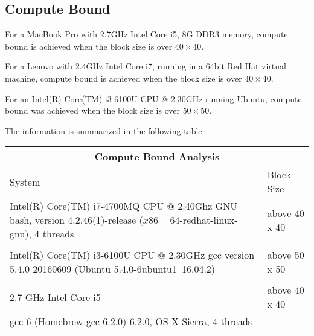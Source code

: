 \documentclass[12pt]{article}
\newcommand{\0}{\mathbf{0}}
\begin{document}
\subsection{Compute Bound}

For a MacBook Pro with 2.7GHz Intel Core i5, 8G DDR3 memory, compute bound is achieved when the block size is over $40\times 40$.

\bigskip

For a Lenovo with 2.4GHz Intel Core i7, running in a 64bit Red Hat virtual machine, compute bound is achieved when the block size is over $40\times 40$.

\bigskip

For an Intel(R) Core(TM) i3-6100U CPU @ 2.30GHz running Ubuntu, compute bound was achieved when the block size is over $50\times 50$. 


\newpage

The information is summarized in the following table:

\begin{center}

    \begin{tabular}{ |p{9cm}||p{3cm}|}
	\hline
	\multicolumn{2}{|c|}{Compute Bound Analysis} \\
	\hline
	System& Block Size \\
	\hline
	Intel(R) Core(TM) i7-4700MQ CPU @ 2.40Ghz
	GNU bash, version 4.2.46(1)-release ($x86-64$-redhat-linux-gnu), 4 threads & above 40 x 40\\
	&  \\
	Intel(R) Core(TM) i3-6100U CPU @ 2.30GHz
	gcc version 5.4.0 20160609 (Ubuntu 5.4.0-6ubuntu1~16.04.2)
	& above 50 x 50 \\
	& \\
	2.7 GHz Intel Core i5 & above 40 x 40   \\
	gcc-6 (Homebrew gcc 6.2.0) 6.2.0, OS X Sierra, 4 threads &  \\
	\hline
    \end{tabular}

\end{center}
\end{document}
